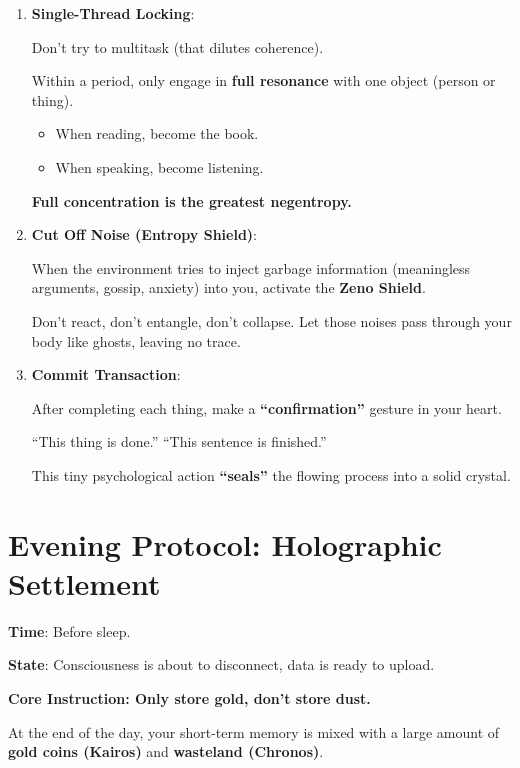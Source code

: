 \begin{enumerate}
\item \textbf{Single-Thread Locking}:

    Don't try to multitask (that dilutes coherence).

    Within a period, only engage in \textbf{full resonance} with one object (person or thing).

    \begin{itemize}
    \item When reading, become the book.

    \item When speaking, become listening.
    \end{itemize}

    \textbf{Full concentration is the greatest negentropy.}

\item \textbf{Cut Off Noise (Entropy Shield)}:

    When the environment tries to inject garbage information (meaningless arguments, gossip, anxiety) into you, activate the \textbf{Zeno Shield}.

    Don't react, don't entangle, don't collapse. Let those noises pass through your body like ghosts, leaving no trace.

\item \textbf{Commit Transaction}:

    After completing each thing, make a \textbf{``confirmation''} gesture in your heart.

    ``This thing is done.'' ``This sentence is finished.''

    This tiny psychological action \textbf{``seals''} the flowing process into a solid crystal.
\end{enumerate}

\section{Evening Protocol: Holographic Settlement}

\textbf{Time}: Before sleep.

\textbf{State}: Consciousness is about to disconnect, data is ready to upload.

\textbf{Core Instruction: Only store gold, don't store dust.}

At the end of the day, your short-term memory is mixed with a large amount of \textbf{gold coins (Kairos)} and \textbf{wasteland (Chronos)}.


